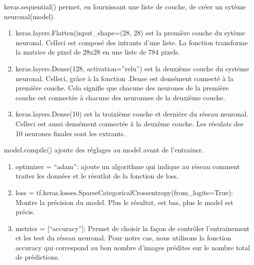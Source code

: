 \documentclass[letterpaper,10pt,french]{sphinxmanual}
\begin{document}
keras.sequential() permet, en fournissant une liste de couche, de créer un sytème neuronal(model).
\begin{enumerate}
%
\item {} 
keras.layers.Flatten(input\_shape=(28, 28) est la première couche du sytème neuronal. Celle\sphinxhyphen{}ci est composé des intrants d’une liste. La fonction transforme la matrice de pixel de 28x28 en une liste de 784 pixels.

\item {} 
keras.layers.Dense(128, activation=”relu”) est la deuxième couche du système neuronal. Celle\sphinxhyphen{}ci, grâce à la fonction .Dense est densément connecté à la première couche. Cela signifie que chacune des neurones de la première couche est connectée à chacune des neuronnes de la deuxième couche.

\item {} 
keras.layers.Dense(10) est la troixième couche et dernière du réseau neuronal. Celle\sphinxhyphen{}ci est aussi densément connectée à la deuxème couche. Les résulats des 10 neurones finales sont les extrants.

\end{enumerate}

\begin{sphinxVerbatim}[commandchars=\\\{\}]
  \PYG{p}{[}
     
     
\PYG{p}{]}
\end{sphinxVerbatim}

model.compile() ajoute des réglages au model avant de l’entrainer.
\begin{enumerate}
%
\item {} 
optimizer = “adam”: ajoute un algorithme qui indique au réseau comment traiter les données et le résutlat de la fonction de loss.

\item {} 
loss = tf.keras.losses.SparseCategoricalCrossentropy(from\_logits=True): Montre la précision du model. Plus le résultat, est bas, plus le model est précis.

\item {} 
metrics = {[}“accuracy”{]}: Permet de choisir la façon de contrôler l’entrainement et les test du réseau neuronal. Pour notre cas, nous utilisons la fonction accuracy qui correspond au bon nombre d’images prédites sur le nombre total de prédictions.

\end{enumerate}
\end{document}
